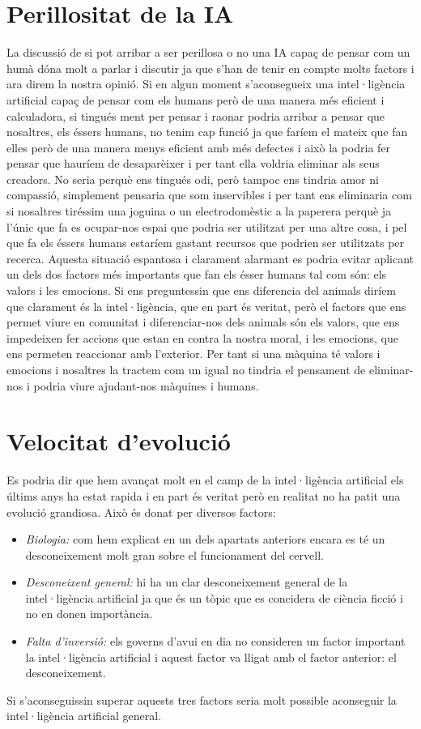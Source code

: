 \section {Perillositat de la IA}
La discussió de si pot arribar a ser perillosa o no una IA capaç de pensar com un humà dóna molt a parlar i discutir ja que s'han de tenir en compte molts factors i ara direm la nostra
opinió.
Si en algun moment s'aconsegueix una intel·ligència artificial capaç de pensar com els humans però de una manera més eficient i calculadora, si tingués ment per pensar i raonar podria arribar
a pensar que nosaltres, els éssers humans, no tenim cap funció ja que faríem el mateix que fan elles però de una manera menys eficient amb més defectes i això la podria fer pensar que hauríem
de desaparèixer i per tant ella voldria eliminar als seus creadors. No seria perquè ens tingués odi, però tampoc ens tindria amor ni compassió, simplement pensaria que som inservibles i per tant
ens eliminaria com si nosaltres tiréssim una joguina o un electrodomèstic a la paperera perquè ja l'únic que fa es ocupar-nos espai que podria ser utilitzat per una altre cosa, i pel que fa
els éssers humans estaríem gastant recursos que podrien ser utilitzats per recerca. Aquesta situació espantosa i clarament alarmant es podria evitar aplicant un dels dos factors més importants
que fan els ésser humans tal com són: els valors i les emocions. Si ens preguntessin que ens diferencia del animals diríem que clarament és la intel·ligència, que en part és veritat, però el
factors que ens permet viure en comunitat i diferenciar-nos dels animals són els valors, que ens impedeixen fer accions que estan en contra la nostra moral, i les emocions, que ens permeten
reaccionar amb l'exterior. Per tant si una màquina té valors i emocions i nosaltres la tractem com un igual no tindria el pensament de eliminar-nos i podria viure ajudant-nos màquines i humans.

\section {Velocitat d'evolució}
Es podria dir que hem avançat molt en el camp de la intel·ligència artificial els últims anys ha estat rapida i en part és veritat però en realitat no ha patit una evolució grandiosa. Això és
donat per diversos factors:
\begin {itemize}
\item \emph{Biologia:} com hem explicat en un dels apartats anteriors encara es té un desconeixement molt gran sobre el funcionament del cervell.
\item \emph{Desconeixent general:} hi ha un clar desconeixement general de la intel·ligència artificial ja que és un tòpic que es concidera de ciència ficció i no en donen importància.
\item \emph{Falta d'inversió:} els governs d'avui en dia no consideren un factor important la intel·ligència artificial i aquest factor va lligat amb el factor anterior: el desconeixement.
\end {itemize}
Si s'aconseguissin superar aquests tres factors seria molt possible aconseguir la intel·ligència artificial general.
